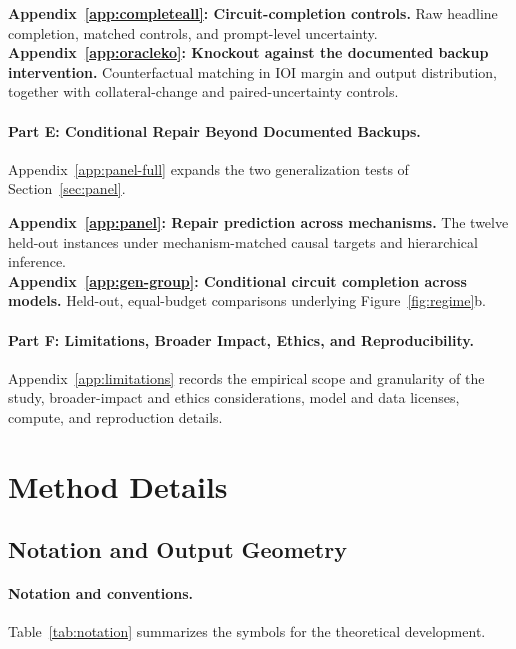 \noindent\textbf{Appendix~\ref{app:completeall}: Circuit-completion controls.}
Raw headline completion, matched controls, and prompt-level uncertainty.\\
\noindent\textbf{Appendix~\ref{app:oracleko}: Knockout against the documented backup intervention.}
Counterfactual matching in IOI margin and output distribution, together with collateral-change and paired-uncertainty controls.

\vspace{1mm}
\paragraph{Part E: Conditional Repair Beyond Documented Backups.}
Appendix~\ref{app:panel-full} expands the two generalization tests of Section~\ref{sec:panel}.
\vspace{-1mm}

\noindent\textbf{Appendix~\ref{app:panel}: Repair prediction across mechanisms.}
The twelve held-out instances under mechanism-matched causal targets and hierarchical inference.\\
\noindent\textbf{Appendix~\ref{app:gen-group}: Conditional circuit completion across models.}
Held-out, equal-budget comparisons underlying Figure~\ref{fig:regime}b.

\vspace{1mm}
\paragraph{Part F: Limitations, Broader Impact, Ethics, and Reproducibility.}
Appendix~\ref{app:limitations} records the empirical scope and granularity of the study, broader-impact and ethics considerations, model and data licenses, compute, and reproduction details.

\clearpage
\section{Method Details}\label{app:method}

\subsection{Notation and Output Geometry}
\label{app:geometry}

\paragraph{Notation and conventions.}
\label{app:terms}
Table~\ref{tab:notation} summarizes the symbols for the theoretical development.

